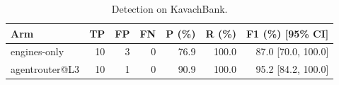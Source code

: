 \begin{table}[t]
\centering
\begin{tabular}{lrrrrrr}
\hline
Arm & TP & FP & FN & P (\%) & R (\%) & F1 (\%) [95\% CI] \\
\hline
engines-only & 10 & 3 & 0 & 76.9 & 100.0 & 87.0 [70.0, 100.0] \\
agentrouter@L3 & 10 & 1 & 0 & 90.9 & 100.0 & 95.2 [84.2, 100.0] \\
\hline
\end{tabular}
\caption{Detection on KavachBank.}
\label{tab:detection}
\end{table}
